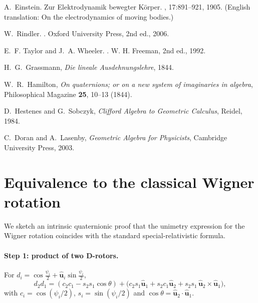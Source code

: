 \documentclass[11pt]{article}
\numberwithin{equation}{section}
\providecommand{\uhat}{\hat{\mathbf u}}
\begin{document}

\begin{thebibliography}{9}

A.~Einstein.
\newblock Zur Elektrodynamik bewegter K\"{o}rper.
, 17:891--921, 1905.
(English translation: On the electrodynamics of moving bodies.)

W.~Rindler.
.
\newblock Oxford University Press, 2nd ed., 2006.

E.~F. Taylor and J.~A. Wheeler.
.
\newblock W. H. Freeman, 2nd ed., 1992.


H.~G.~Grassmann,
\newblock \emph{Die lineale Ausdehnungslehre}, 1844.

W.~R.~Hamilton,
\newblock \emph{On quaternions; or on a new system of imaginaries in algebra}, Philosophical Magazine \textbf{25}, 10--13 (1844).

D.~Hestenes and G.~Sobczyk,
\newblock \emph{Clifford Algebra to Geometric Calculus}, Reidel, 1984.

C.~Doran and A.~Lasenby,
\newblock \emph{Geometric Algebra for Physicists}, Cambridge University Press, 2003.

\end{thebibliography}




\appendix
\section{Equivalence to the classical Wigner rotation}
\label{app:wigner-classical}

We sketch an intrinsic quaternionic proof that the unimetry expression for the Wigner rotation
coincides with the standard special-relativistic formula.

\paragraph{Step 1: product of two D-rotors.}
For $d_i=\cos\frac{\psi_i}{2}+\uhat_i\sin\frac{\psi_i}{2}$,
\begin{equation}
d_2 d_1
=(c_2c_1-s_2s_1\cos\theta)
+\Big(c_2s_1\uhat_1+s_2c_1\uhat_2+s_2s_1\,\uhat_2\times\uhat_1\Big),
\end{equation}
with $c_i=\cos(\psi_i/2)$, $s_i=\sin(\psi_i/2)$ and $\cos\theta=\uhat_2\!\cdot\!\uhat_1$.
\end{document}
